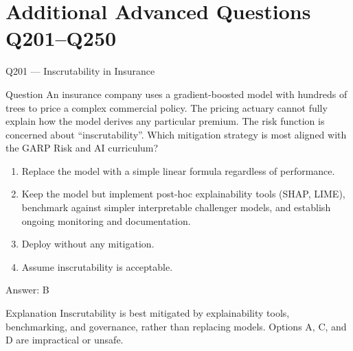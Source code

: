 \documentclass[aspectratio=169,8pt]{beamer}
\begin{document}
									\section{Additional Advanced Questions Q201--Q250}
									
									\begin{frame}{Q201 --- Inscrutability in Insurance}
										\begin{block}{Question}
											An insurance company uses a gradient-boosted model with hundreds of trees to price a complex commercial policy. The pricing actuary cannot fully explain how the model derives any particular premium. The risk function is concerned about ``inscrutability''. Which mitigation strategy is most aligned with the GARP Risk and AI curriculum?

										\begin{enumerate}
											\item Replace the model with a simple linear formula regardless of performance.
											\item Keep the model but implement post-hoc explainability tools (SHAP, LIME), benchmark against simpler interpretable challenger models, and establish ongoing monitoring and documentation.
											\item Deploy without any mitigation.
											\item Assume inscrutability is acceptable.
										\end{enumerate}  \end{block}
										\begin{exampleblock}{Answer: B}\end{exampleblock}
										\begin{block}{Explanation}
											Inscrutability is best mitigated by explainability tools, benchmarking, and governance, rather than replacing models. Options A, C, and D are impractical or unsafe.
										\end{block}
									\end{frame}
									
\end{document}

